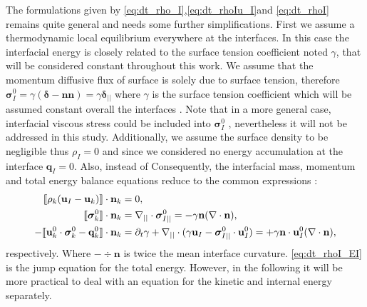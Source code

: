 The formulations given by \ref{eq:dt_rho_I},\ref{eq:dt_rhoIu_I}and \ref{eq:dt_rhoI} remains quite general and needs some further simplifications. 
First we assume a thermodynamic local equilibrium everywhere at the interfaces. 
In this case the interfacial energy is closely related to the surface tension coefficient noted $\gamma$, that will be considered constant throughout this work. 
We assume that the momentum diffusive flux of surface is solely due to surface tension, therefore $\bm{\sigma}_I^0  = \gamma (\bm\delta - \textbf{nn}) = \gamma \bm\delta_{||}$ where $\gamma$ is the surface tension coefficient which will be assumed constant overall the interfaces \citep[Chapter 2]{tryggvason2011direct}.  
Note that in a more general case, interfacial viscous stress could be included into $\bm{\sigma}_{I}^0$ \citep{brenner2013interfacial,slattery2007interfacial,nadim1996concise}, nevertheless it will not be addressed in this study. 
Additionally, we assume the surface density to be negligible thus $\rho_I = 0$ and since we considered no energy accumulation at the interface $\textbf{q}_I=0$.
Also, instead of 
Consequently, the interfacial mass, momentum and total energy balance equations reduce to the common expressions :
\begin{align}
    \label{eq:dt_rho_I}
    \llbracket 
        \rho_k (\textbf{u}_I - \textbf{u}_k)
     \rrbracket \cdot \textbf{n}_k
    &=0, \\
    \llbracket \bm{\sigma}_k^0 \rrbracket \cdot \textbf{n}_k 
    &=
    \mathbf{\nabla}_{||}\cdot\bm\sigma^0_{I||}
    =
    -\gamma\textbf{n}(\mathbf{\nabla}\cdot \textbf{n}),
    \label{eq:surface_tension}\\
    \label{eq:dt_rhoI_EI}
    - \llbracket \textbf{u}_k^0 \cdot \bm{\sigma}_k^0 - \textbf{q}_k^0 \rrbracket \cdot \textbf{n}_k
    &=
    \partial_t \gamma + \mathbf{\nabla}_{||}\cdot(\gamma \textbf{u}_I - \bm\sigma^0_{I||}\cdot \textbf{u}_I^0 )
    =
    + \gamma\textbf{n}\cdot \textbf{u}_{I}^0(\mathbf{\nabla}\cdot \textbf{n}),
\end{align}
respectively. 
Where $ - \div\textbf{n}$ is twice the mean interface curvature.
\ref{eq:dt_rhoI_EI} is the jump equation for the total energy.
However, in the following it will be more practical to deal with an equation for the kinetic and internal energy separately. 
